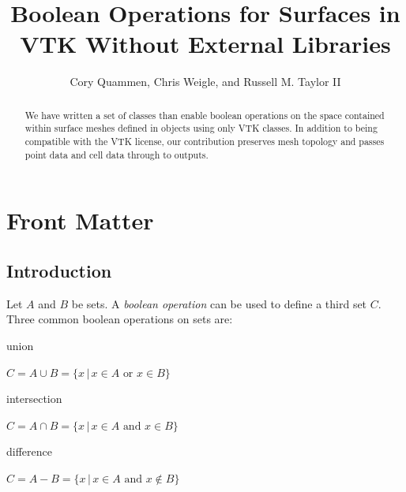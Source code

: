 \documentclass{InsightArticle}
\title{Boolean Operations for Surfaces in VTK Without External Libraries}
\author{Cory Quammen, Chris Weigle, and Russell M. Taylor II}
\newcommand{\IJhandlerIDnumber}{1338}
\begin{document}
%
% 
\IJhandlefooter{\IJhandlerIDnumber}


\ifpdf
\else
\fi


\maketitle


\ifhtml
\chapter*{Front Matter\label{front}}
\fi


\begin{abstract}
\noindent
We have written a set of classes than enable boolean operations on the space contained within surface meshes defined in  objects using only VTK classes. In addition to being compatible with the VTK license, our contribution preserves mesh topology and passes point data and cell data through to outputs.

\end{abstract}

\IJhandlenote{\IJhandlerIDnumber}

\tableofcontents

\section{Introduction}
\label{sec:Introduction}

Let $A$ and $B$ be sets. A \emph{boolean operation} can be used to define a third set $C$. Three common boolean operations on sets are:

\begin{description}

\item union

 $C = A \cup B = \{ x \, | \, x \in A \text{ or } x \in B \}$

\item intersection

$C = A \cap B = \{ x \, | \, x \in A \text{ and } x \in B \}$

\item difference

$C = A - B = \{ x \, | \, x \in A \text{ and } x \notin B \}$

\end{description}
\end{document}
